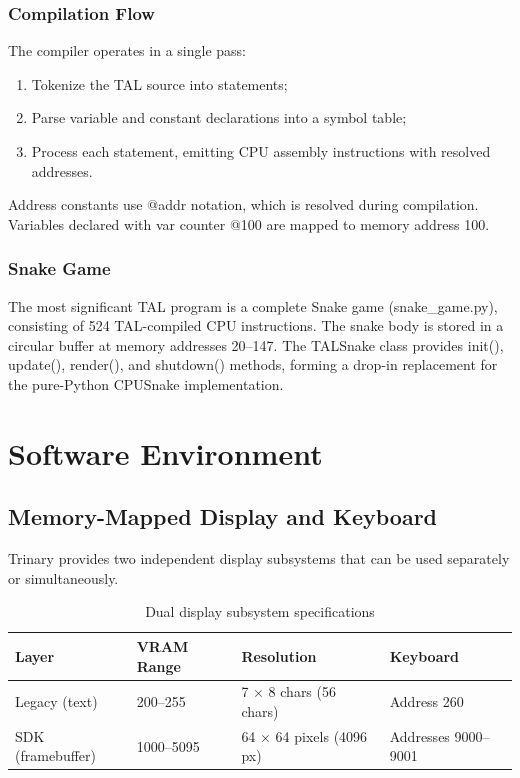 \documentclass[12pt,a4paper,twoside]{book}
\theoremstyle{trinarytheorem}
\theoremstyle{trinarydefinition}
\newcommand{\code}[1]{\textsf{#1}}
\begin{document}
\section{Compilation Flow}

The compiler operates in a single pass:
\begin{enumerate}
    \item Tokenize the TAL source into statements;
    \item Parse variable and constant declarations into a symbol table;
    \item Process each statement, emitting CPU assembly instructions with resolved
          addresses.
\end{enumerate}

Address constants use \code{@addr} notation, which is resolved during compilation.
Variables declared with \code{var counter @100} are mapped to memory address 100.

\section{Snake Game}

The most significant TAL program is a complete Snake game (\code{snake\_game.py}),
consisting of 524 TAL-compiled CPU instructions. The snake body is stored in a
circular buffer at memory addresses 20--147. The \code{TALSnake} class provides
\code{init()}, \code{update()}, \code{render()}, and \code{shutdown()}
methods, forming a drop-in replacement for the pure-Python \code{CPUSnake}
implementation.

\part{Software Environment}

\chapter{Memory-Mapped Display and Keyboard}
\label{ch:display}

Trinary provides two independent display subsystems that can be used separately or
simultaneously.

\begin{table}[H]
\centering
\caption{Dual display subsystem specifications}
\label{tab:displays}
\begin{tabular}{llll}
\toprule
Layer & VRAM Range & Resolution & Keyboard \\
\midrule
Legacy (text) & 200--255 & 7 $\times$ 8 chars (56 chars) & Address 260 \\
SDK (framebuffer) & 1000--5095 & 64 $\times$ 64 pixels (4096 px) & Addresses 9000--9001 \\
\bottomrule
\end{tabular}
\end{table}
\end{document}
